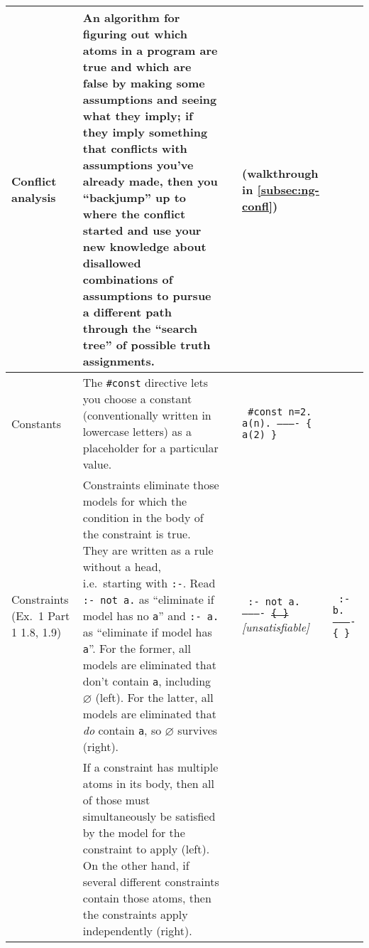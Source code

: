 \documentclass[9pt,a4paper,landscape]{article}
\begin{document}
{\begin{longtable}{Lp{14.5cm}lXX}
\\ \midrule

Conflict analysis
& An algorithm for figuring out which atoms in a program are true and which are false by making some assumptions and seeing what they imply; if they imply something that conflicts with assumptions you've already made, then you ``backjump'' up to where the conflict started and use your new knowledge about disallowed combinations of assumptions to pursue a different path through the ``search tree'' of possible truth assignments.
&& (walkthrough in \ref{subsec:ng-confl}) &\\ \midrule


Constants
& The \texttt{\#const} directive lets you choose a constant (conventionally written in lowercase letters) as a placeholder for a particular value.
&& \texttt{%
	\#const n=2. \newline
	a(n). \newline
	---------- \newline
	\{ a(2) \}} & \\ \midrule


Constraints \newline (Ex.\ 1 Part 1  1.8, 1.9)
& Constraints eliminate those models for which the condition in the body of the constraint is true.
They are written as a rule without a head, i.e.\ starting with \texttt{:-}.
Read \texttt{:- not a.} as ``eliminate if model has no \texttt{a}'' and \texttt{:- a.} as ``eliminate if model has \texttt{a}''.
For the former, all models are eliminated that don't contain \texttt{a}, including $\varnothing$ (left).
For the latter, all models are eliminated that \textit{do} contain \texttt{a}, so $\varnothing$ survives (right).

&& \texttt{%
	:- not a. \newline
	---------- \newline
	\sout{\{ \}}} \newline		
\textit{[unsatisfiable]}
& \texttt{%
	:- b. \newline
	---------- \newline
	\{ \} } \\

& If a constraint has multiple atoms in its body, then all of those must simultaneously be satisfied by the model for the constraint to apply (left).
On the other hand, if several different constraints contain those atoms, then the constraints apply independently (right). \newline


\end{longtable}}
\end{document}
